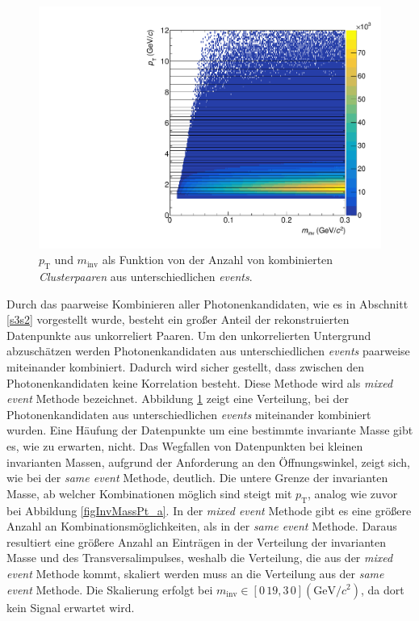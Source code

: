 \begin{figure}[t!]
\centering
\includegraphics[width=.7\linewidth]{hInvMass_pT_Bkg.pdf}
\caption{$p_\text{T}$ und $m_\text{inv}$ als Funktion von der Anzahl von kombinierten  \textit{Clusterpaaren} aus unterschiedlichen \textit{events}.}
\label{figInvMassPt_b}
\end{figure}
Durch das paarweise Kombinieren aller Photonenkandidaten, wie es in Abschnitt \ref{s3s2} vorgestellt wurde, besteht ein großer Anteil der rekonstruierten Datenpunkte aus unkorreliert Paaren.
Um den unkorrelierten Untergrund abzuschätzen werden Photonenkandidaten aus unterschiedlichen \textit{events} paarweise miteinander kombiniert.
Dadurch wird sicher gestellt, dass zwischen den Photonenkandidaten keine Korrelation besteht.
Diese Methode wird als \textit{mixed event} Methode bezeichnet.
Abbildung \ref{figInvMassPt_b} zeigt eine Verteilung, bei der Photonenkandidaten aus unterschiedlichen \textit{events} miteinander kombiniert wurden.
Eine Häufung der Datenpunkte um eine bestimmte invariante Masse gibt es, wie zu erwarten, nicht.
Das Wegfallen von Datenpunkten bei kleinen invarianten Massen, aufgrund der Anforderung an den Öffnungswinkel, zeigt sich, wie bei der \textit{same event} Methode, deutlich.
Die untere Grenze der invarianten Masse, ab welcher Kombinationen möglich sind steigt mit $p_\text{T}$, analog wie zuvor bei Abbildung  \ref{figInvMassPt_a}.
\newline
In der \textit{mixed event} Methode gibt es eine größere Anzahl an Kombinationsmöglichkeiten, als in der \textit{same event} Methode.
Daraus resultiert eine größere Anzahl an Einträgen in der Verteilung der invarianten Masse und des Transversalimpulses, weshalb die Verteilung, die aus der \textit{mixed event} Methode kommt, skaliert werden muss an die Verteilung aus der \textit{same event} Methode.
Die Skalierung erfolgt bei $m_\text{inv} \in \left[0\,19,3\,0\right] (\text{GeV/}c^{2})$, da dort kein Signal erwartet wird.
